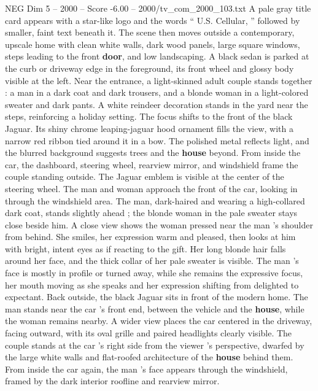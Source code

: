 \begin{textsample}{NEG Dim 5 – 2000 – Score -6.00 – 2000/tv\_com\_2000\_103.txt}  \label{ex:f5_neg_072}
A pale gray title card appears with a star-like logo and the words “ U.S.
Cellular, ” followed by smaller, faint text beneath it.
The scene then moves outside a contemporary, upscale home with clean white walls, dark wood panels, large square windows, steps leading to the front \textbf{door}, and low landscaping.
A black sedan is parked at the curb or driveway edge in the foreground, its front wheel and glossy body visible at the left.
Near the entrance, a light-skinned adult couple stands together : a man in a dark coat and dark trousers, and a blonde woman in a light-colored sweater and dark pants.
A white reindeer decoration stands in the yard near the steps, reinforcing a holiday setting.
The focus shifts to the front of the black Jaguar.
Its shiny chrome leaping-jaguar hood ornament fills the view, with a narrow red ribbon tied around it in a bow.
The polished metal reflects light, and the blurred background suggests trees and the \textbf{house} beyond.
From inside the car, the dashboard, steering wheel, rearview mirror, and windshield frame the couple standing outside.
The Jaguar emblem is visible at the center of the steering wheel.
The man and woman approach the front of the car, looking in through the windshield area.
The man, dark-haired and wearing a high-collared dark coat, stands slightly ahead ; the blonde woman in the pale sweater stays close beside him.
A close view shows the woman pressed near the man ’s shoulder from behind.
She smiles, her expression warm and pleased, then looks at him with bright, intent eyes as if reacting to the gift.
Her long blonde hair falls around her face, and the thick collar of her pale sweater is visible.
The man ’s face is mostly in profile or turned away, while she remains the expressive focus, her mouth moving as she speaks and her expression shifting from delighted to expectant.
Back outside, the black Jaguar sits in front of the modern home.
The man stands near the car ’s front end, between the vehicle and the \textbf{house}, while the woman remains nearby.
A wider view places the car centered in the driveway, facing outward, with its oval grille and paired headlights clearly visible.
The couple stands at the car ’s right side from the viewer ’s perspective, dwarfed by the large white walls and flat-roofed architecture of the \textbf{house} behind them.
From inside the car again, the man ’s face appears through the windshield, framed by the dark interior roofline and rearview mirror.

\end{textsample}
